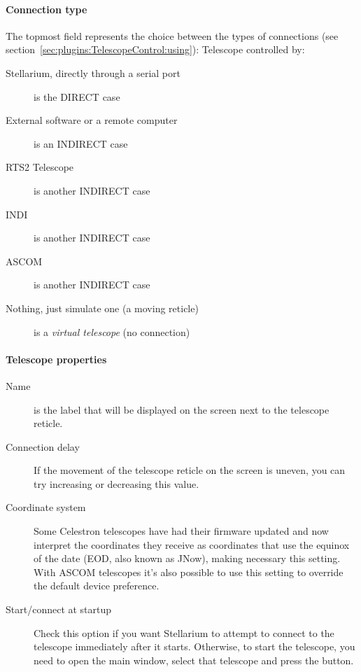 \paragraph{Connection type}
The topmost field represents the choice between the types of connections (see section~\ref{sec:plugins:TelescopeControl:using}):
Telescope controlled by:
\begin{description}
\item[Stellarium, directly through a serial port] is the DIRECT case
\item[External software or a remote computer] is an INDIRECT case
\item[RTS2 Telescope] is another INDIRECT case
\item[INDI] is another INDIRECT case
\item[ASCOM] is another INDIRECT case
\item[Nothing, just simulate one (a moving reticle)] is a \emph{virtual telescope} (no connection)
\end{description}

\paragraph{Telescope properties}
\label{sec:plugins:TelescopeProperties}

\begin{description}
\item[Name] is the label that will be displayed on the screen next to
  the telescope reticle.
\item[Connection delay] If the movement of the telescope reticle on
  the screen is uneven, you can try increasing or decreasing this
  value.
\item[Coordinate system] Some Celestron telescopes have had their
  firmware updated and now interpret the coordinates they receive as
  coordinates that use the equinox of the date (EOD, also known as
  JNow), making necessary this setting. With ASCOM telescopes it's also
  possible to use this setting to override the default device preference. 
\item[Start/connect at startup] Check this option if you want
  Stellarium to attempt to connect to the telescope immediately after
  it starts. Otherwise, to start the telescope, you need to open the
  main window, select that telescope and press the 
  button.
\end{description}


